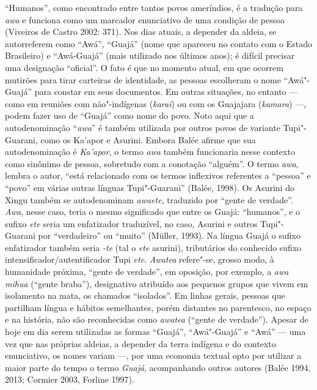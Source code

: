 ``Humanos'', como encontrado entre tantos povos ameríndios, é a tradução
para \emph{awa} e funciona como um marcador enunciativo de uma condição
de pessoa (Viveiros de Castro 2002: 371). Nos dias atuais, a depender da
aldeia, se autorreferem como ``Awá'', ``Guajá'' (nome que apareceu no
contato com o Estado Brasileiro) e ``Awá-Guajá'' (mais utilizado nos
últimos anos); é difícil precisar uma designação ``oficial''. O fato é que
no momento atual, em que ocorrem mutirões para tirar carteiras de
identidade, as pessoas escolheram o nome ``Awá"-Guajá'' para constar em
seus documentos. Em outras situações, no entanto --- como em reuniões com
não"-indígenas (\emph{karai}) ou com os Guajajara (\emph{kamara}) ---,
podem fazer uso de ``Guajá'' como nome do povo. Noto aqui que a
autodenominação ``\emph{awa}'' é também utilizada por outros povos de
variante Tupi"-Guarani, como os Ka'apor e Asurini. Embora Balée afirme
que sua autodenominação é \emph{Ka'apor}, o termo \emph{awa} também
funcionaria nesse contexto como sinônimo de pessoa, sobretudo com a
conotação ``alguém''. O termo \emph{awa}, lembra o autor, ``está
relacionado com os termos inflexivos referentes a ``pessoa'' e ``povo'' em
várias outras línguas Tupi"-Guarani'' (Balée, 1998). Os Asurini do Xingu
também se autodenominam \emph{awaete}, traduzido por ``gente de verdade''.
\emph{Awa}, nesse caso, teria o mesmo significado que entre os Guajá:
``humanos'', e o sufixo \emph{ete} seria um enfatizador traduzível, no
caso, Asurini e outros Tupi"-Guarani por ``verdadeiro'' ou ``muito'' (Müller,
1993). Na língua Guajá o sufixo enfatizador também seria \emph{-te}
(tal o \emph{ete} asurini), tributários do conhecido sufixo
intensificador/autentificador Tupi \emph{ete}. \emph{Awatea} refere"-se,
grosso modo, à humanidade próxima, ``gente de verdade'', em oposição,
por exemplo, a \emph{awa mihua} (``gente braba''), designativo atribuído
aos pequenos grupos que vivem em isolamento na mata, os chamados
``isolados''. Em linhas gerais, pessoas que partilham língua e hábitos
semelhantes, porém distantes no parentesco, no espaço e na história, não
são reconhecidas como \emph{awatea} (``gente de verdade''). Apesar de hoje
em dia serem utilizadas as formas ``Guajá'', ``Awá"-Guajá'' e ``Awá'' ---
uma vez que nas próprias aldeias, a depender da terra indígena e do
contexto enunciativo, os nomes variam ---, por uma economia textual opto
por utilizar a maior parte do tempo o termo \emph{Guajá}, acompanhando
outros autores (Balée 1994, 2013; Cormier 2003, Forline 1997).

